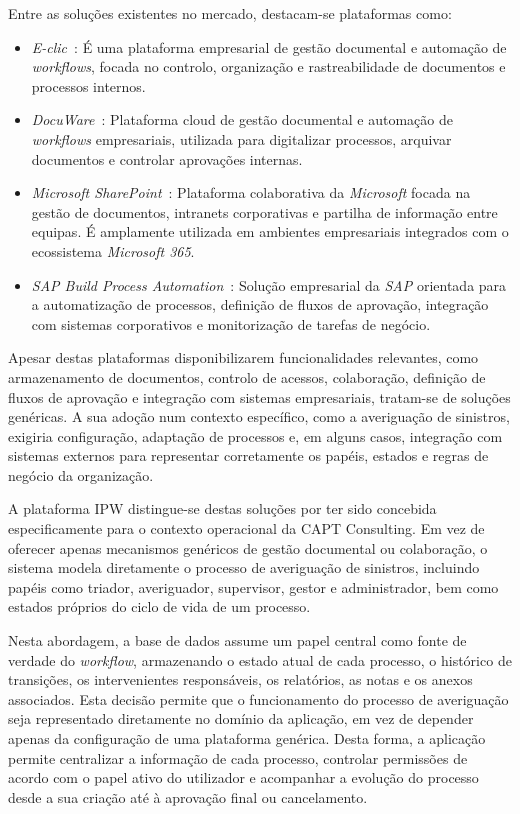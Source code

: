 Entre as soluções existentes no mercado, destacam-se plataformas como:
\begin{itemize}
  \item \textit{E-clic}~\cite{e-clic}: É uma plataforma empresarial de gestão documental e automação de \textit{workflows}, focada no controlo, organização e rastreabilidade de documentos e processos internos.
  \item \textit{DocuWare}~\cite{docuware}: Plataforma cloud de gestão documental e automação de \textit{workflows} empresariais, utilizada para digitalizar processos, arquivar documentos e controlar aprovações internas.
  \item \textit{Microsoft SharePoint}~\cite{sharepoint}: Plataforma colaborativa da \textit{Microsoft} focada na gestão de documentos, intranets corporativas e partilha de informação entre equipas. É amplamente utilizada em ambientes empresariais integrados com o ecossistema \textit{Microsoft 365}.
  \item \textit{SAP Build Process Automation}~\cite{sap-build-process-automation}: Solução empresarial da \textit{SAP} orientada para a automatização de processos, definição de fluxos de aprovação, integração com sistemas corporativos e monitorização de tarefas de negócio.
\end{itemize}

Apesar destas plataformas disponibilizarem funcionalidades relevantes, como armazenamento de documentos, controlo de acessos, colaboração, definição de fluxos de aprovação e integração com sistemas empresariais, tratam-se de soluções genéricas. A sua adoção num contexto específico, como a averiguação de sinistros, exigiria configuração, adaptação de processos e, em alguns casos, integração com sistemas externos para representar corretamente os papéis, estados e regras de negócio da organização.

A plataforma IPW distingue-se destas soluções por ter sido concebida especificamente para o contexto operacional da CAPT Consulting. Em vez de oferecer apenas mecanismos genéricos de gestão documental ou colaboração, o sistema modela diretamente o processo de averiguação de sinistros, incluindo papéis como triador, averiguador, supervisor, gestor e administrador, bem como estados próprios do ciclo de vida de um processo.

Nesta abordagem, a base de dados assume um papel central como fonte de verdade do \textit{workflow}, armazenando o estado atual de cada processo, o histórico de transições, os intervenientes responsáveis, os relatórios, as notas e os anexos associados. Esta decisão permite que o funcionamento do processo de averiguação seja representado diretamente no domínio da aplicação, em vez de depender apenas da configuração de uma plataforma genérica. Desta forma, a aplicação permite centralizar a informação de cada processo, controlar permissões de acordo com o papel ativo do utilizador e acompanhar a evolução do processo desde a sua criação até à aprovação final ou cancelamento.

